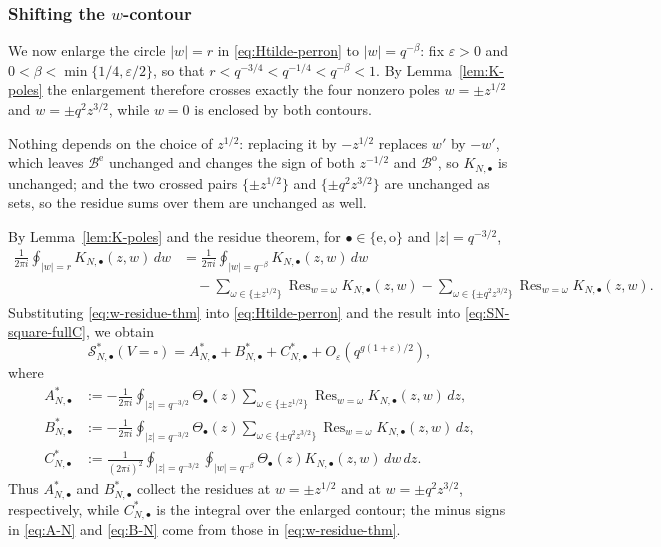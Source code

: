 \documentclass[a4paper,reqno]{amsart}
\numberwithin{equation}{section}
\theoremstyle{remark}
\theoremstyle{definition}
\begin{document}
\subsubsection{Shifting the $w$-contour}

We now enlarge the circle $|w|=r$ in \eqref{eq:Htilde-perron} to
$|w|=q^{-\beta}$: fix $\varepsilon>0$ and
$0<\beta<\min\{1/4,\varepsilon/2\}$, so that
$r<q^{-3/4}<q^{-1/4}<q^{-\beta}<1$. By Lemma~\ref{lem:K-poles} the
enlargement therefore crosses exactly the four nonzero poles
$w=\pm z^{1/2}$ and $w=\pm q^{2}z^{3/2}$, while $w=0$ is enclosed by both
contours.

Nothing depends on the choice of $z^{1/2}$: replacing it by $-z^{1/2}$
replaces $w'$ by $-w'$, which leaves $\mathcal B^{\mathrm e}$ unchanged and
changes the sign of both $z^{-1/2}$ and $\mathcal B^{\mathrm o}$, so
$K_{N,\bullet}$ is unchanged; and the two crossed pairs
$\{\pm z^{1/2}\}$ and $\{\pm q^2z^{3/2}\}$ are unchanged as sets, so the
residue sums over them are unchanged as well.

By Lemma~\ref{lem:K-poles} and the residue theorem, for
$\bullet\in\{\mathrm e,\mathrm o\}$ and $|z|=q^{-3/2}$,
\begin{equation}\label{eq:w-residue-thm}
\begin{aligned}
\frac{1}{2\pi i}\oint_{|w|=r}K_{N,\bullet}(z,w)\,dw
&=
\frac{1}{2\pi i}\oint_{|w|=q^{-\beta}}K_{N,\bullet}(z,w)\,dw\\
&\quad-
\sum_{\omega\in\{\pm z^{1/2}\}}
\operatorname{Res}_{w=\omega}K_{N,\bullet}(z,w)
-
\sum_{\omega\in\{\pm q^2z^{3/2}\}}
\operatorname{Res}_{w=\omega}K_{N,\bullet}(z,w).
\end{aligned}
\end{equation}
Substituting \eqref{eq:w-residue-thm} into
\eqref{eq:Htilde-perron} and the result into \eqref{eq:SN-square-fullC},
we obtain
$$
\mathcal S_{N,\bullet}^{*}(V=\square)
=
A_{N,\bullet}^{*}
+
B_{N,\bullet}^{*}
+
C_{N,\bullet}^{*}
+
O_\varepsilon\!\left(q^{g(1+\varepsilon)/2}\right),
$$
where
\begin{align}
A_{N,\bullet}^{*}
&:=
-\frac{1}{2\pi i}
\oint_{|z|=q^{-3/2}}
\Theta_\bullet(z)
\sum_{\omega\in\{\pm z^{1/2}\}}
\operatorname{Res}_{w=\omega}
K_{N,\bullet}(z,w)\,dz,
\label{eq:A-N}\\
B_{N,\bullet}^{*}
&:=
-\frac{1}{2\pi i}
\oint_{|z|=q^{-3/2}}
\Theta_\bullet(z)
\sum_{\omega\in\{\pm q^2z^{3/2}\}}
\operatorname{Res}_{w=\omega}
K_{N,\bullet}(z,w)\,dz,
\label{eq:B-N}\\
C_{N,\bullet}^{*}
&:=
\frac{1}{(2\pi i)^2}
\oint_{|z|=q^{-3/2}}\oint_{|w|=q^{-\beta}}
\Theta_\bullet(z)K_{N,\bullet}(z,w)\,dw\,dz.
\label{eq:C-N}
\end{align}
Thus $A_{N,\bullet}^{*}$ and $B_{N,\bullet}^{*}$ collect the residues at
$w=\pm z^{1/2}$ and at $w=\pm q^2z^{3/2}$, respectively, while
$C_{N,\bullet}^{*}$ is the integral over the enlarged contour; the minus
signs in \eqref{eq:A-N} and \eqref{eq:B-N} come from those in
\eqref{eq:w-residue-thm}.
\end{document}
